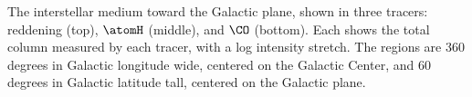 The interstellar medium toward the Galactic plane, shown in three tracers: reddening (top), $\atomH$ (middle), and $\CO$ (bottom). Each shows the total column measured by each tracer, with a log intensity stretch. The regions are 360 degrees in Galactic longitude wide, centered on the Galactic Center, and 60 degrees in Galactic latitude tall, centered on the Galactic plane.  

